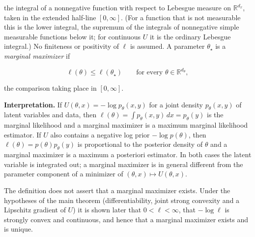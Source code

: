 \documentclass[11pt,a4paper]{article}
\begin{document}
the integral of a nonnegative function with respect to Lebesgue measure on \(\mathbb R^{d_x}\), taken in the extended half-line \([0,\infty]\). (For a function that is not measurable this is the lower integral, the supremum of the integrals of nonnegative simple measurable functions below it; for continuous \(U\) it is the ordinary Lebesgue integral.) No finiteness or positivity of \(\ell\) is assumed. A parameter \(\theta_\star\) is a \emph{marginal maximizer} if


\[\ell(\theta)\le\ell(\theta_\star)\qquad\text{for every }\theta\in\mathbb R^{d_\theta},\]


the comparison taking place in \([0,\infty]\).




\textbf{Interpretation.} If \(U(\theta,x)=-\log p_\theta(x,y)\) for a joint density \(p_\theta(x,y)\) of latent variables and data, then \(\ell(\theta)=\int p_\theta(x,y)\,dx=p_\theta(y)\) is the marginal likelihood and a marginal maximizer is a maximum marginal likelihood estimator. If \(U\) also contains a negative log prior \(-\log p(\theta)\), then \(\ell(\theta)=p(\theta)p_\theta(y)\) is proportional to the posterior density of \(\theta\) and a marginal maximizer is a maximum a posteriori estimator. In both cases the latent variable is integrated out; a marginal maximizer is in general different from the parameter component of a minimizer of \((\theta,x)\mapsto U(\theta,x)\).




The definition does not assert that a marginal maximizer exists. Under the hypotheses of the main theorem (differentiability, joint strong convexity and a Lipschitz gradient of \(U\)) it is shown later that \(0<\ell<\infty\), that \(-\log\ell\) is strongly convex and continuous, and hence that a marginal maximizer exists and is unique.
\end{document}
